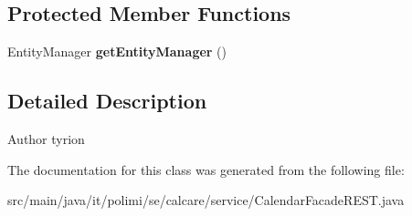 \subsection*{Protected Member Functions}
\begin{DoxyCompactItemize}
\item 
\hypertarget{classit_1_1polimi_1_1se_1_1calcare_1_1service_1_1CalendarFacadeREST_a7533056a006fadcb1fbd39a95efcde15}{}Entity\+Manager {\bfseries get\+Entity\+Manager} ()\label{classit_1_1polimi_1_1se_1_1calcare_1_1service_1_1CalendarFacadeREST_a7533056a006fadcb1fbd39a95efcde15}

\end{DoxyCompactItemize}


\subsection{Detailed Description}
\begin{DoxyAuthor}{Author}
tyrion 
\end{DoxyAuthor}


The documentation for this class was generated from the following file\+:\begin{DoxyCompactItemize}
\item 
src/main/java/it/polimi/se/calcare/service/Calendar\+Facade\+R\+E\+S\+T.\+java\end{DoxyCompactItemize}
